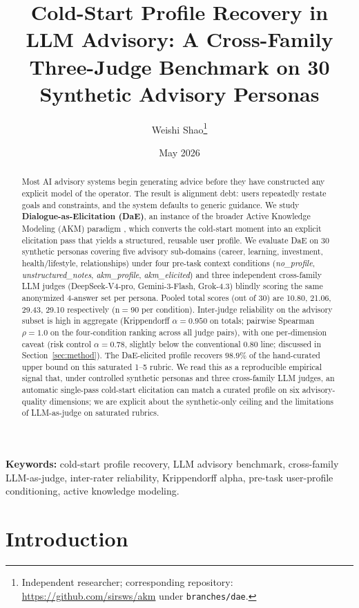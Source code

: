 \documentclass[11pt]{article}
\title{Cold-Start Profile Recovery in LLM Advisory: A Cross-Family Three-Judge Benchmark on 30 Synthetic Advisory Personas}
\author{Weishi Shao\thanks{Independent researcher; corresponding repository: \url{https://github.com/sirsws/akm} under \texttt{branches/dae}.}}
\date{May 2026}
\begin{document}
\maketitle

\begin{abstract}
Most AI advisory systems begin generating advice before they have constructed any explicit model of the operator. The result is alignment debt: users repeatedly restate goals and constraints, and the system defaults to generic guidance. We study \textbf{Dialogue-as-Elicitation (DaE)}, an instance of the broader Active Knowledge Modeling (AKM) paradigm \citep{shao2026akm}, which converts the cold-start moment into an explicit elicitation pass that yields a structured, reusable user profile. We evaluate DaE on 30 synthetic personas covering five advisory sub-domains (career, learning, investment, health/lifestyle, relationships) under four pre-task context conditions (\textit{no\_profile}, \textit{unstructured\_notes}, \textit{akm\_profile}, \textit{akm\_elicited}) and three independent cross-family LLM judges (DeepSeek-V4-pro, Gemini-3-Flash, Grok-4.3) blindly scoring the same anonymized 4-answer set per persona. Pooled total scores (out of 30) are 10.80, 21.06, 29.43, 29.10 respectively (n${=}$90 per condition). Inter-judge reliability on the advisory subset is high in aggregate (Krippendorff $\alpha = 0.950$ on totals; pairwise Spearman $\rho = 1.0$ on the four-condition ranking across all judge pairs), with one per-dimension caveat (risk control $\alpha = 0.78$, slightly below the conventional $0.80$ line; discussed in Section~\ref{sec:method}). The DaE-elicited profile recovers $98.9\%$ of the hand-curated upper bound on this saturated 1--5 rubric. We read this as a reproducible empirical signal that, under controlled synthetic personas and three cross-family LLM judges, an automatic single-pass cold-start elicitation can match a curated profile on six advisory-quality dimensions; we are explicit about the synthetic-only ceiling and the limitations of LLM-as-judge on saturated rubrics.
\end{abstract}

\textbf{Keywords:} cold-start profile recovery, LLM advisory benchmark, cross-family LLM-as-judge, inter-rater reliability, Krippendorff alpha, pre-task user-profile conditioning, active knowledge modeling.

\section{Introduction}
\end{document}
